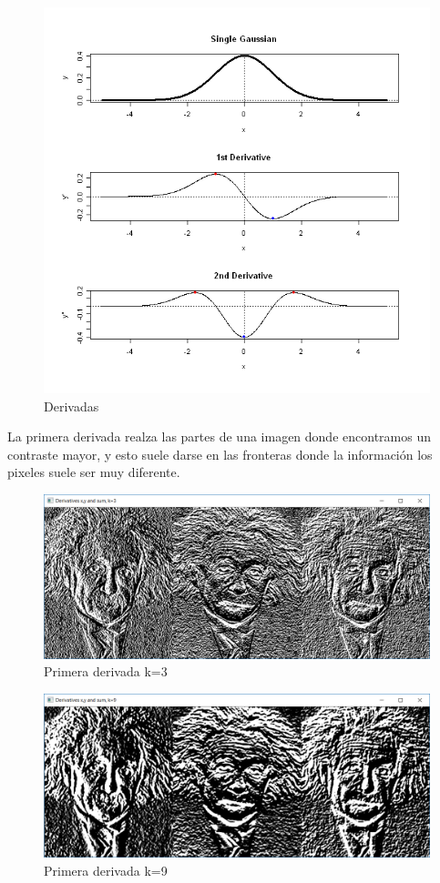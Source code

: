 \documentclass{article}
\begin{document}
\begin{figure}[h]
\centering
\includegraphics[scale=0.5]{2b3.PNG}
\caption{Derivadas}
\end{figure}

La primera derivada realza las partes de una imagen donde encontramos un contraste mayor, y esto suele darse en las fronteras donde la información los pixeles suele ser muy diferente.



\begin{figure}[h]
\centering
\includegraphics[scale=0.5]{2b1.PNG}
\caption{Primera derivada k=3}
\end{figure}


\begin{figure}[h]
\centering
\includegraphics[scale=0.5]{2b2.PNG}
\caption{Primera derivada k=9}
\end{figure}
\end{document}
